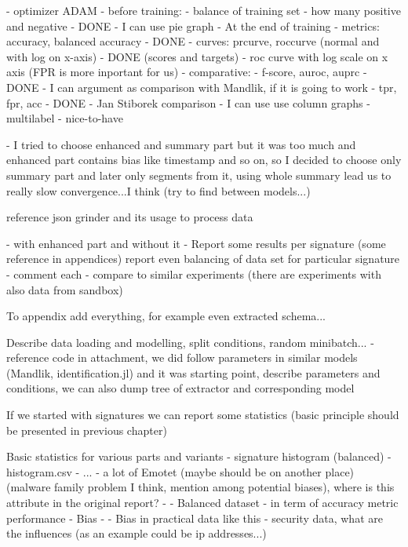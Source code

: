 {            - optimizer ADAM
        - before training:
            - balance of training set - how many positive and negative - DONE
                - I can use pie graph
        - At the end of training
            - metrics: accuracy, balanced accuracy - DONE
            - curves: prcurve, roccurve (normal and with log on x-axis) - DONE (scores and targets)
                - roc curve with log scale on x axis (FPR is more inportant for us)
            - comparative: 
                - f-score, auroc, auprc - DONE
                    - I can argument as comparison with Mandlik, if it is going to work
                - tpr, fpr, acc - DONE
                    - Jan Stiborek comparison
                    - I can use use column graphs
        - multilabel - nice-to-have


- I tried to choose enhanced and summary part but it was too much and enhanced part contains bias like timestamp and so on, so I decided to choose only summary part and later only segments from it, using whole summary lead us to really slow convergence...I think (try to find between models...)

reference json grinder and its usage to process data

- with enhanced part and without it
  - Report some results per signature (some reference in appendices) report even balancing of data set for particular signature
  - comment each
  - compare to similar experiments (there are experiments with also data from sandbox)



To appendix add everything, for example even extracted schema...

Describe data loading and modelling, split conditions, random minibatch... - reference code in attachment, we did follow parameters in similar models (Mandlik, identification.jl) and it was starting point, describe parameters and conditions, we can also dump tree of extractor and corresponding model


If we started with signatures we can report some statistics (basic principle should be presented in previous chapter)

Basic statistics for various parts and variants
  - signature histogram (balanced) - histogram.csv
  - ...
  - a lot of Emotet (maybe should be on another place) (malware family problem I think, mention among potential biases), where is this attribute in the original report?
  - - Balanced dataset - in term of accuracy metric performance
  - Bias - - Bias in practical data like this - security data, what are the influences (as an example could be ip addresses...)

}
